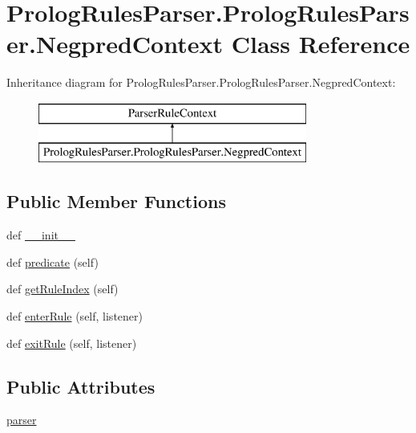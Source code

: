 \hypertarget{class_prolog_rules_parser_1_1_prolog_rules_parser_1_1_negpred_context}{}\section{Prolog\+Rules\+Parser.\+Prolog\+Rules\+Parser.\+Negpred\+Context Class Reference}
\label{class_prolog_rules_parser_1_1_prolog_rules_parser_1_1_negpred_context}
Inheritance diagram for Prolog\+Rules\+Parser.\+Prolog\+Rules\+Parser.\+Negpred\+Context\+:\begin{figure}[H]
\begin{center}
\leavevmode
\includegraphics[height=2.000000cm]{class_prolog_rules_parser_1_1_prolog_rules_parser_1_1_negpred_context}
\end{center}
\end{figure}
\subsection*{Public Member Functions}
\begin{DoxyCompactItemize}
\item 
def \hyperlink{class_prolog_rules_parser_1_1_prolog_rules_parser_1_1_negpred_context_a40efc79fd3d05195cf11000bf135f2c3}{\+\_\+\+\_\+init\+\_\+\+\_\+}
\item 
def \hyperlink{class_prolog_rules_parser_1_1_prolog_rules_parser_1_1_negpred_context_a27d1ef33b96942ddcf08f1bee2d64094}{predicate} (self)
\item 
def \hyperlink{class_prolog_rules_parser_1_1_prolog_rules_parser_1_1_negpred_context_a005a7204a6f408bf3d123ccc1358ba0f}{get\+Rule\+Index} (self)
\item 
def \hyperlink{class_prolog_rules_parser_1_1_prolog_rules_parser_1_1_negpred_context_a549a9924eeb8f9a50df73bdfb21cf3f4}{enter\+Rule} (self, listener)
\item 
def \hyperlink{class_prolog_rules_parser_1_1_prolog_rules_parser_1_1_negpred_context_a1535ce17471bbc8929a322a7537bb866}{exit\+Rule} (self, listener)
\end{DoxyCompactItemize}
\subsection*{Public Attributes}
\begin{DoxyCompactItemize}
\item 
\hyperlink{class_prolog_rules_parser_1_1_prolog_rules_parser_1_1_negpred_context_a25d436043a2b3c31d38202d859a326b3}{parser}
\end{DoxyCompactItemize}


